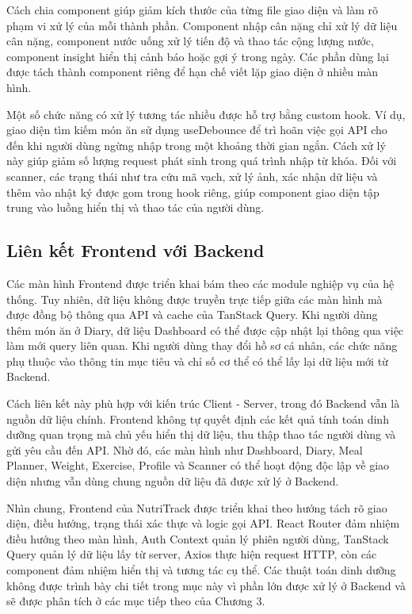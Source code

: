 \documentclass[12pt, a4paper]{report}
\begin{document}
Cách chia component giúp giảm kích thước của từng file giao diện và làm rõ phạm vi xử lý của mỗi thành phần. Component nhập cân nặng chỉ xử lý dữ liệu cân nặng, component nước uống xử lý tiến độ và thao tác cộng lượng nước, component insight hiển thị cảnh báo hoặc gợi ý trong ngày. Các phần dùng lại được tách thành component riêng để hạn chế viết lặp giao diện ở nhiều màn hình.

Một số chức năng có xử lý tương tác nhiều được hỗ trợ bằng custom hook. Ví dụ, giao diện tìm kiếm món ăn sử dụng useDebounce để trì hoãn việc gọi API cho đến khi người dùng ngừng nhập trong một khoảng thời gian ngắn. Cách xử lý này giúp giảm số lượng request phát sinh trong quá trình nhập từ khóa. Đối với scanner, các trạng thái như tra cứu mã vạch, xử lý ảnh, xác nhận dữ liệu và thêm vào nhật ký được gom trong hook riêng, giúp component giao diện tập trung vào luồng hiển thị và thao tác của người dùng.

\subsection{Liên kết Frontend với Backend}Các màn hình Frontend được triển khai bám theo các module nghiệp vụ của hệ thống. Tuy nhiên, dữ liệu không được truyền trực tiếp giữa các màn hình mà được đồng bộ thông qua API và cache của TanStack Query. Khi người dùng thêm món ăn ở Diary, dữ liệu Dashboard có thể được cập nhật lại thông qua việc làm mới query liên quan. Khi người dùng thay đổi hồ sơ cá nhân, các chức năng phụ thuộc vào thông tin mục tiêu và chỉ số cơ thể có thể lấy lại dữ liệu mới từ Backend.

Cách liên kết này phù hợp với kiến trúc Client - Server, trong đó Backend vẫn là nguồn dữ liệu chính. Frontend không tự quyết định các kết quả tính toán dinh dưỡng quan trọng mà chủ yếu hiển thị dữ liệu, thu thập thao tác người dùng và gửi yêu cầu đến API. Nhờ đó, các màn hình như Dashboard, Diary, Meal Planner, Weight, Exercise, Profile và Scanner có thể hoạt động độc lập về giao diện nhưng vẫn dùng chung nguồn dữ liệu đã được xử lý ở Backend.

Nhìn chung, Frontend của NutriTrack được triển khai theo hướng tách rõ giao diện, điều hướng, trạng thái xác thực và logic gọi API. React Router đảm nhiệm điều hướng theo màn hình, Auth Context quản lý phiên người dùng, TanStack Query quản lý dữ liệu lấy từ server, Axios thực hiện request HTTP, còn các component đảm nhiệm hiển thị và tương tác cụ thể. Các thuật toán dinh dưỡng không được trình bày chi tiết trong mục này vì phần lớn được xử lý ở Backend và sẽ được phân tích ở các mục tiếp theo của Chương 3.
\end{document}
